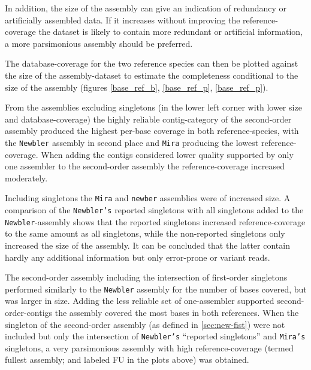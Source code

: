In addition, the size of the assembly can give an indication of
redundancy or artificially assembled data. If it increases without
improving the reference-coverage the dataset is likely to contain more
redundant or artificial information, a more parsimonious assembly
should be preferred.

The database-coverage for the two reference species can then be
plotted against the size of the assembly-dataset to estimate the
completeness conditional to the size of the assembly (figures
\ref{base_ref_b}, \ref{base_ref_p}, \ref{base_ref_p}).

From the assemblies excluding singletons (in the lower left corner
with lower size and database-coverage) the highly reliable
contig-category of the second-order assembly produced the highest
per-base coverage in both reference-species, with the \texttt{Newbler}
assembly in second place and \texttt{Mira} producing the lowest
reference-coverage. When adding the contigs considered lower quality
supported by only one assembler to the second-order assembly the
reference-coverage increased moderately.

Including singletons the \texttt{Mira} and \texttt{newber} assemblies
were of increased size. A comparison of the \texttt{Newbler's}
reported singletons with all singletons added to the
\texttt{Newbler}-assembly shows that the reported singletons increased
reference-coverage to the same amount as all singletons, while the
non-reported singletons only increased the size of the assembly. It
can be concluded that the latter contain hardly any additional
information but only error-prone or variant reads.

The second-order assembly including the intersection of first-order
singletons performed similarly to the \texttt{Newbler} assembly for
the number of bases covered, but was larger in size. Adding the less
reliable set of one-assembler supported second-order-contigs the
assembly covered the most bases in both references. When the singleton
of the second-order assembly (as defined in \ref{sec:new-fist}) were
not included but only the intersection of \texttt{Newbler's}
``reported singletons'' and \texttt{Mira's} singletons, a very
parsimonious assembly with high reference-coverage (termed fullest
assembly; and labeled FU in the plots above) was obtained.





